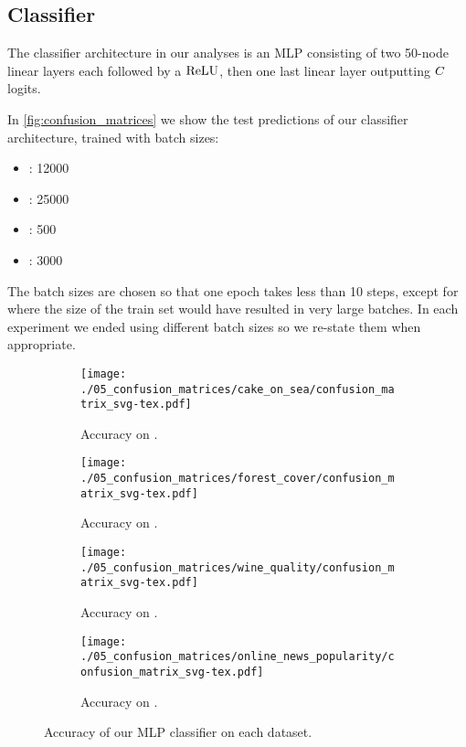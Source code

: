 \documentclass[../main.tex]{subfiles}
\begin{document}
\subsection{Classifier}
\label{exp/classifiers}

The classifier architecture in our analyses is an MLP consisting of two 50-node linear layers each followed by a $\text{ReLU}$, then one last linear layer outputting $C$ logits.

In \autoref{fig:confusion_matrices} we show the test predictions of our classifier architecture, trained with batch sizes:
\begin{itemize}
    \item \CakeOnSea: 12000
    \item \ForestCover: 25000
    \item \WineQuality: 500
    \item \OnlineNewsPopularity: 3000
\end{itemize}
The batch sizes are chosen so that one epoch takes less than 10 steps, except for \ForestCover{} where the size of the train set would have resulted in very large batches.
In each experiment we ended using different batch sizes so we re-state them when appropriate.

\begin{figure}
    \centering
    \begin{subfigure}[b]{0.4\textwidth}
        \centering
\texttt{[image: ./05\_confusion\_matrices/cake\_on\_sea/confusion\_matrix\_svg-tex.pdf]}
        \caption{Accuracy on \CakeOnSea.}
\label{fig:cos_confusion_matrix}
    \end{subfigure}
    \begin{subfigure}[b]{0.4\textwidth}
        \centering
\texttt{[image: ./05\_confusion\_matrices/forest\_cover/confusion\_matrix\_svg-tex.pdf]}
        \caption{Accuracy on \ForestCover.}
    \end{subfigure}

    \begin{subfigure}[b]{0.4\textwidth}
        \centering
\texttt{[image: ./05\_confusion\_matrices/wine\_quality/confusion\_matrix\_svg-tex.pdf]}
        \caption{Accuracy on \WineQuality.}
    \end{subfigure}
    \begin{subfigure}[b]{0.4\textwidth}
        \centering
\texttt{[image: ./05\_confusion\_matrices/online\_news\_popularity/confusion\_matrix\_svg-tex.pdf]}
        \caption{Accuracy on \OnlineNewsPopularity.}
    \end{subfigure}

    \caption{Accuracy of our MLP classifier on each dataset.}
    \label{fig:confusion_matrices}
\end{figure}
\end{document}
